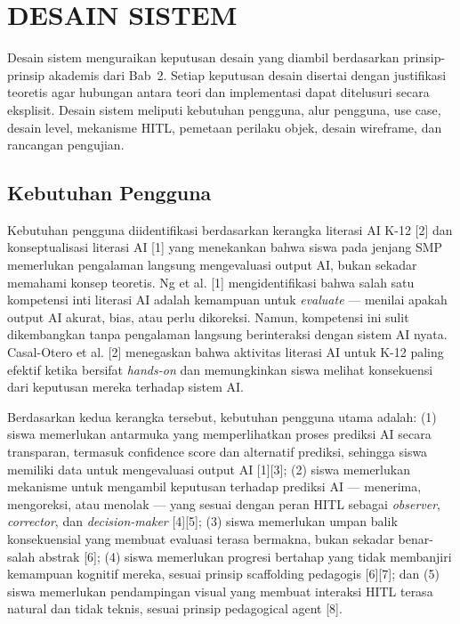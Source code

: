 \section{DESAIN SISTEM}
\label{sec:desain-sistem}

Desain sistem menguraikan keputusan desain yang diambil berdasarkan prinsip-prinsip akademis dari Bab~2. Setiap keputusan desain disertai dengan justifikasi teoretis agar hubungan antara teori dan implementasi dapat ditelusuri secara eksplisit. Desain sistem meliputi kebutuhan pengguna, alur pengguna, use case, desain level, mekanisme HITL, pemetaan perilaku objek, desain wireframe, dan rancangan pengujian.


\subsection{Kebutuhan Pengguna}
\label{subsec:kebutuhan-pengguna}

Kebutuhan pengguna diidentifikasi berdasarkan kerangka literasi AI K-12 [2] dan konseptualisasi literasi AI [1] yang menekankan bahwa siswa pada jenjang SMP memerlukan pengalaman langsung mengevaluasi output AI, bukan sekadar memahami konsep teoretis. Ng et al. [1] mengidentifikasi bahwa salah satu kompetensi inti literasi AI adalah kemampuan untuk \textit{evaluate} --- menilai apakah output AI akurat, bias, atau perlu dikoreksi. Namun, kompetensi ini sulit dikembangkan tanpa pengalaman langsung berinteraksi dengan sistem AI nyata. Casal-Otero et al. [2] menegaskan bahwa aktivitas literasi AI untuk K-12 paling efektif ketika bersifat \textit{hands-on} dan memungkinkan siswa melihat konsekuensi dari keputusan mereka terhadap sistem AI.

Berdasarkan kedua kerangka tersebut, kebutuhan pengguna utama adalah: (1) siswa memerlukan antarmuka yang memperlihatkan proses prediksi AI secara transparan, termasuk confidence score dan alternatif prediksi, sehingga siswa memiliki data untuk mengevaluasi output AI [1][3]; (2) siswa memerlukan mekanisme untuk mengambil keputusan terhadap prediksi AI --- menerima, mengoreksi, atau menolak --- yang sesuai dengan peran HITL sebagai \textit{observer}, \textit{corrector}, dan \textit{decision-maker} [4][5]; (3) siswa memerlukan umpan balik konsekuensial yang membuat evaluasi terasa bermakna, bukan sekadar benar-salah abstrak [6]; (4) siswa memerlukan progresi bertahap yang tidak membanjiri kemampuan kognitif mereka, sesuai prinsip scaffolding pedagogis [6][7]; dan (5) siswa memerlukan pendampingan visual yang membuat interaksi HITL terasa natural dan tidak teknis, sesuai prinsip pedagogical agent [8].

